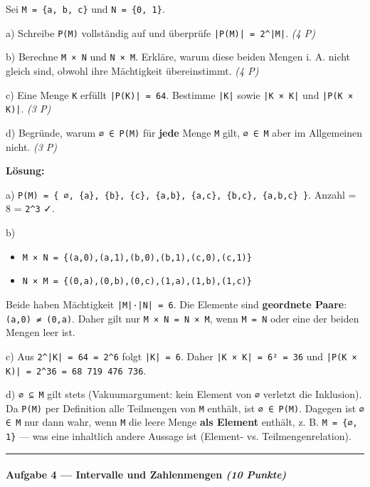\documentclass[11pt, a4paper]{article}
\begin{document}
Sei \texttt{M = \{a, b, c\}} und \texttt{N = \{0, 1\}}.


a) Schreibe \texttt{P(M)} vollständig auf und überprüfe \texttt{|P(M)| = 2\textasciicircum{}|M|}. \textit{(4 P)}


b) Berechne \texttt{M × N} und \texttt{N × M}. Erkläre, warum diese beiden Mengen i. A. nicht gleich sind, obwohl ihre Mächtigkeit übereinstimmt. \textit{(4 P)}


c) Eine Menge \texttt{K} erfüllt \texttt{|P(K)| = 64}. Bestimme \texttt{|K|} sowie \texttt{|K × K|} und \texttt{|P(K × K)|}. \textit{(3 P)}


d) Begründe, warum \texttt{∅ ∈ P(M)} für \textbf{jede} Menge \texttt{M} gilt, \texttt{∅ ∈ M} aber im Allgemeinen nicht. \textit{(3 P)}


\textbf{Lösung:}


a) \texttt{P(M) = \{ ∅, \{a\}, \{b\}, \{c\}, \{a,b\}, \{a,c\}, \{b,c\}, \{a,b,c\} \}}. Anzahl = 8 = \texttt{2\textasciicircum{}3} ✓.


b)

\begin{itemize}
  \item \texttt{M × N = \{(a,0),(a,1),(b,0),(b,1),(c,0),(c,1)\}}
  \item \texttt{N × M = \{(0,a),(0,b),(0,c),(1,a),(1,b),(1,c)\}}
\end{itemize}

Beide haben Mächtigkeit \texttt{|M|·|N| = 6}. Die Elemente sind \textbf{geordnete Paare}: \texttt{(a,0) ≠ (0,a)}. Daher gilt nur \texttt{M × N = N × M}, wenn \texttt{M = N} oder eine der beiden Mengen leer ist.


c) Aus \texttt{2\textasciicircum{}|K| = 64 = 2\textasciicircum{}6} folgt \texttt{|K| = 6}. Daher \texttt{|K × K| = 6² = 36} und \texttt{|P(K × K)| = 2\textasciicircum{}36 = 68 719 476 736}.


d) \texttt{∅ ⊆ M} gilt stets (Vakuumargument: kein Element von \texttt{∅} verletzt die Inklusion). Da \texttt{P(M)} per Definition alle Teilmengen von \texttt{M} enthält, ist \texttt{∅ ∈ P(M)}. Dagegen ist \texttt{∅ ∈ M} nur dann wahr, wenn \texttt{M} die leere Menge \textbf{als Element} enthält, z. B. \texttt{M = \{∅, 1\}} — was eine inhaltlich andere Aussage ist (Element- vs. Teilmengenrelation).



\noindent\textcolor{rulegray}{\rule{\linewidth}{0.4pt}}


\paragraph{Aufgabe 4 — Intervalle und Zahlenmengen \textit{(10 Punkte)}}\mbox{}\\[2pt]
\end{document}
